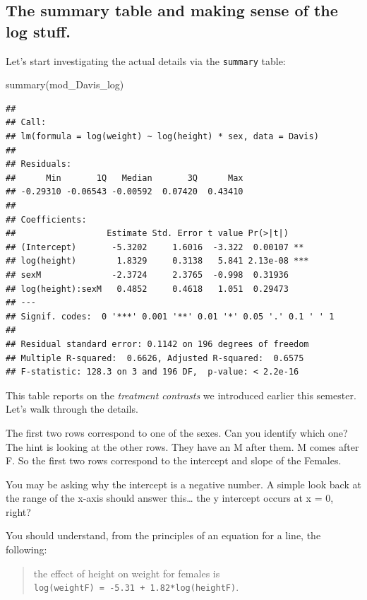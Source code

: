 \documentclass[
]{book}
\newenvironment{Shaded}{\begin{snugshade}}{\end{snugshade}}
\newcommand{\FunctionTok}[1]{\textcolor[rgb]{0.00,0.00,0.00}{#1}}
\newcommand{\NormalTok}[1]{#1}
\begin{document}
\hypertarget{the-summary-table-and-making-sense-of-the-log-stuff.}{%
\subsection{The summary table and making sense of the log stuff.}\label{the-summary-table-and-making-sense-of-the-log-stuff.}}

Let's start investigating the actual details via the \texttt{summary} table:

\begin{Shaded}
\begin{Highlighting}[]
\FunctionTok{summary}\NormalTok{(mod\_Davis\_log)}
\end{Highlighting}
\end{Shaded}

\begin{verbatim}
## 
## Call:
## lm(formula = log(weight) ~ log(height) * sex, data = Davis)
## 
## Residuals:
##      Min       1Q   Median       3Q      Max 
## -0.29310 -0.06543 -0.00592  0.07420  0.43410 
## 
## Coefficients:
##                  Estimate Std. Error t value Pr(>|t|)    
## (Intercept)       -5.3202     1.6016  -3.322  0.00107 ** 
## log(height)        1.8329     0.3138   5.841 2.13e-08 ***
## sexM              -2.3724     2.3765  -0.998  0.31936    
## log(height):sexM   0.4852     0.4618   1.051  0.29473    
## ---
## Signif. codes:  0 '***' 0.001 '**' 0.01 '*' 0.05 '.' 0.1 ' ' 1
## 
## Residual standard error: 0.1142 on 196 degrees of freedom
## Multiple R-squared:  0.6626, Adjusted R-squared:  0.6575 
## F-statistic: 128.3 on 3 and 196 DF,  p-value: < 2.2e-16
\end{verbatim}

This table reports on the \emph{treatment contrasts} we introduced earlier this semester. Let's walk through the details.

The first two rows correspond to one of the sexes. Can you identify which one? The hint is looking at the other rows. They have an M after them. M comes after F. So the first two rows correspond to the intercept and slope of the Females.

You may be asking why the intercept is a negative number. A simple look back at the range of the x-axis should answer this\ldots{} the y intercept occurs at x = 0, right?

You should understand, from the principles of an equation for a line, the following:

\begin{quote}
the effect of height on weight for females is \texttt{log(weightF)\ =\ -5.31\ +\ 1.82*log(heightF)}.
\end{quote}
\end{document}
